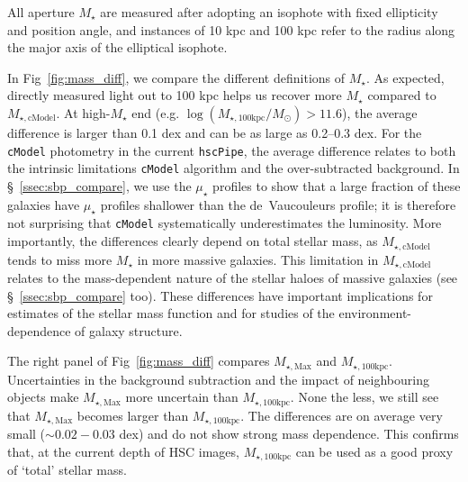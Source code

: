 \documentclass[fleqn,usenatbib]{mnras}
\def\cmodel{\texttt{cModel}}
\def\mstar{{$M_{\star}$}}
\def\mtot{{$M_{\star,100\mathrm{kpc}}$}}
\def\mmax{{$M_{\star,\mathrm{Max}}$}}
\def\mcmodel{{$M_{\star,\mathrm{cModel}}$}}
\def\logmtot{{$\log (M_{\star,100\mathrm{kpc}}/M_{\odot})$}}
\def\mden{{$\mu_{\star}$}}
\begin{document}
    All aperture \mstar{} are measured after adopting an isophote with fixed 
    ellipticity and position angle, and instances of 10 kpc and 100 kpc refer to 
    the radius along the major axis of the elliptical isophote.
       
    
    In Fig~\ref{fig:mass_diff}, we compare the different definitions of \mstar{}. 
    As expected, directly measured light out to 100 kpc helps us recover more \mstar{} 
    compared to \mcmodel{}.
    At high-\mstar{} end (e.g. \logmtot{}$>11.6$), the average difference is larger 
    than 0.1 dex and can be as large as 0.2--0.3 dex.  
    For the \cmodel{} photometry in the current \texttt{hscPipe}, the average 
    difference relates to both the intrinsic limitations \cmodel{} algorithm and the 
    over-subtracted background. 
    In \S~\ref{ssec:sbp_compare}, we use the \mden{} profiles to show that a large 
    fraction of these galaxies have \mden{} profiles shallower than the de~Vaucouleurs 
    profile; it is therefore not surprising that \cmodel{} systematically 
    underestimates the luminosity.
    More importantly, the differences clearly depend on total stellar mass, as 
    \mcmodel{} tends to miss more \mstar{} in more massive galaxies.  
    This limitation in \mcmodel{} relates to the mass-dependent nature of the 
    stellar haloes of massive galaxies (see \S~\ref{ssec:sbp_compare} too).
    These differences have important implications for estimates of the stellar 
    mass function and for studies of the environment-dependence of galaxy structure. 

    The right panel of Fig~\ref{fig:mass_diff} compares \mmax{} and \mtot{}.  
    Uncertainties in the background subtraction and the impact of neighbouring 
    objects make \mmax{} more uncertain than \mtot{}. 
    None the less, we still see that \mmax{} becomes larger than \mtot{}. 
    The differences are on average very small ($\sim0.02-0.03$ dex) and do not show 
    strong mass dependence.  
    This confirms that, at the current depth of HSC images, \mtot{} can be used as 
    a good proxy of `total' stellar mass.  
   
\end{document}
